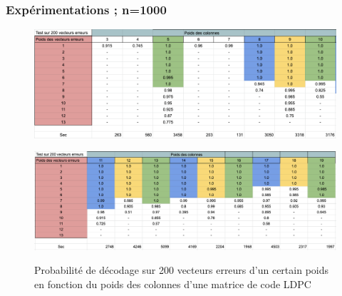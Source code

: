 \documentclass{beamer}
\begin{document}
    \begin{frame}
        \frametitle{Expérimentations ; n=1000}
        \begin{figure}[h!]
            \centering
            \includegraphics[scale=0.5]{res1000_n1.png}
            \label{fig:res1}
        \end{figure}
        \begin{figure}[h!]
            \centering
            \includegraphics[scale=0.5]{res1000_n2.png}
            \label{fig:res2}
            \caption{Probabilité de décodage sur 200 vecteurs erreurs d'un certain poids en fonction du poids des colonnes d'une matrice de code LDPC}
        \end{figure}
    \end{frame}
\end{document}
